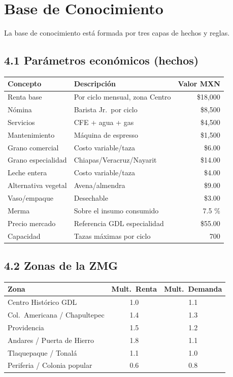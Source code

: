 \documentclass[12pt,spanish]{article}
\begin{document}
\section{Base de Conocimiento}

La base de conocimiento está formada por tres capas de hechos y reglas.

\subsection*{4.1 Parámetros económicos (hechos)}

\begin{center}
\begin{tabular}{llr}
  \toprule
  Concepto & Descripción & Valor MXN \\
  \midrule
  Renta base & Por ciclo mensual, zona Centro & \$18,000 \\
  Nómina & Barista Jr.\ por ciclo & \$8,500 \\
  Servicios & CFE + agua + gas & \$4,500 \\
  Mantenimiento & Máquina de espresso & \$1,500 \\
  \midrule
  Grano comercial & Costo variable/taza & \$6.00 \\
  Grano especialidad & Chiapas/Veracruz/Nayarit & \$14.00 \\
  Leche entera & Costo variable/taza & \$4.00 \\
  Alternativa vegetal & Avena/almendra & \$9.00 \\
  Vaso/empaque & Desechable & \$3.00 \\
  Merma & Sobre el insumo consumido & 7.5 \% \\
  \midrule
  Precio mercado & Referencia GDL especialidad & \$55.00 \\
  Capacidad & Tazas máximas por ciclo & 700 \\
  \bottomrule
\end{tabular}
\end{center}

\subsection*{4.2 Zonas de la ZMG}

\begin{center}
\begin{tabular}{lcc}
  \toprule
  Zona & Mult.\ Renta & Mult.\ Demanda \\
  \midrule
  Centro Histórico GDL & 1.0 & 1.1 \\
  Col.\ Americana / Chapultepec & 1.4 & 1.3 \\
  Providencia & 1.5 & 1.2 \\
  Andares / Puerta de Hierro & 1.8 & 1.1 \\
  Tlaquepaque / Tonalá & 1.1 & 1.0 \\
  Periferia / Colonia popular & 0.6 & 0.8 \\
  \bottomrule
\end{tabular}
\end{center}
\end{document}
